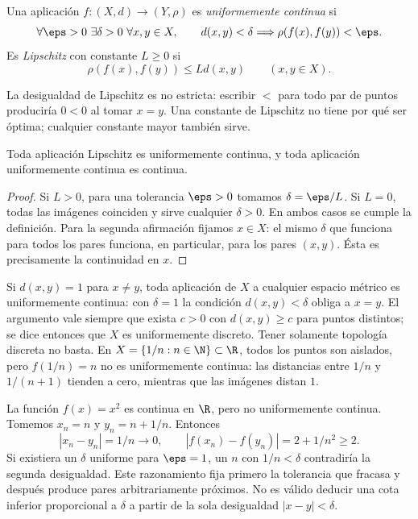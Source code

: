 \begin{definicion}\label{ch07:def-uniforme}
Una aplicación $f:(X,d)\to(Y,\rho)$ es \emph{uniformemente continua} si
\[
 \forall\eps>0\ \exists\delta>0\ \forall x,y\in X,
 \qquad d(x,y)<\delta\Longrightarrow\rho(f(x),f(y))<\eps.
\]
Es \emph{Lipschitz} con constante $L\geq0$ si
\[
 \rho(f(x),f(y))\leq Ld(x,y)\qquad(x,y\in X).
\]
\end{definicion}
La desigualdad de Lipschitz es no estricta: escribir $<$ para todo par de puntos produciría $0<0$ al tomar $x=y$. Una constante de Lipschitz no tiene por qué ser óptima; cualquier constante mayor también sirve.

\begin{proposicion}\label{ch07:lip-uniforme}
Toda aplicación Lipschitz es uniformemente continua, y toda aplicación uniformemente continua es continua.
\end{proposicion}
\begin{proof}
Si $L>0$, para una tolerancia $\eps>0$ tomamos $\delta=\eps/L$. Si $L=0$, todas las imágenes coinciden y sirve cualquier $\delta>0$. En ambos casos se cumple la definición. Para la segunda afirmación fijamos $x\in X$: el mismo $\delta$ que funciona para todos los pares funciona, en particular, para los pares $(x,y)$. Ésta es precisamente la continuidad en $x$.
\end{proof}

\begin{ejemplo}
Si $d(x,y)=1$ para $x\ne y$, toda aplicación de $X$ a cualquier espacio métrico es uniformemente continua: con $\delta=1$ la condición $d(x,y)<\delta$ obliga a $x=y$. El argumento vale siempre que exista $c>0$ con $d(x,y)\geq c$ para puntos distintos; se dice entonces que $X$ es uniformemente discreto. Tener solamente topología discreta no basta. En $X=\{1/n:n\in\N\}\subset\R$, todos los puntos son aislados, pero $f(1/n)=n$ no es uniformemente continua: las distancias entre $1/n$ y $1/(n+1)$ tienden a cero, mientras que las imágenes distan $1$.
\end{ejemplo}

\begin{ejemplo}\label{ch07:cuadrado}
La función $f(x)=x^2$ es continua en $\R$, pero no uniformemente continua. Tomemos $x_n=n$ y $y_n=n+1/n$. Entonces
\[
 |x_n-y_n|=1/n\longrightarrow0,
 \qquad |f(x_n)-f(y_n)|=2+1/n^2\geq2.
\]
Si existiera un $\delta$ uniforme para $\eps=1$, un $n$ con $1/n<\delta$ contradiría la segunda desigualdad. Este razonamiento fija primero la tolerancia que fracasa y después produce pares arbitrariamente próximos. No es válido deducir una cota inferior proporcional a $\delta$ a partir de la sola desigualdad $|x-y|<\delta$.
\end{ejemplo}

